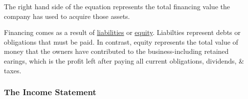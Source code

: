 \documentclass{article}
\begin{document}
	The right hand side of the equation represents the total financing value the company has used to acquire those assets. \newline

	Financing comes as a result of \href{https://www.investopedia.com/terms/l/liability.asp}{liabilities} or \href{https://www.investopedia.com/terms/e/equity.asp}{equity}. Liabilties represent debts
	or obligations that must be paid. In contrast, equity represents the total value of money that the owners have contributed to the business-including retained earings, which is the profit left 
	after paying all current obligations, dividends, \& taxes. \newline

	\subsubsection{The Income Statement}
\end{document}
